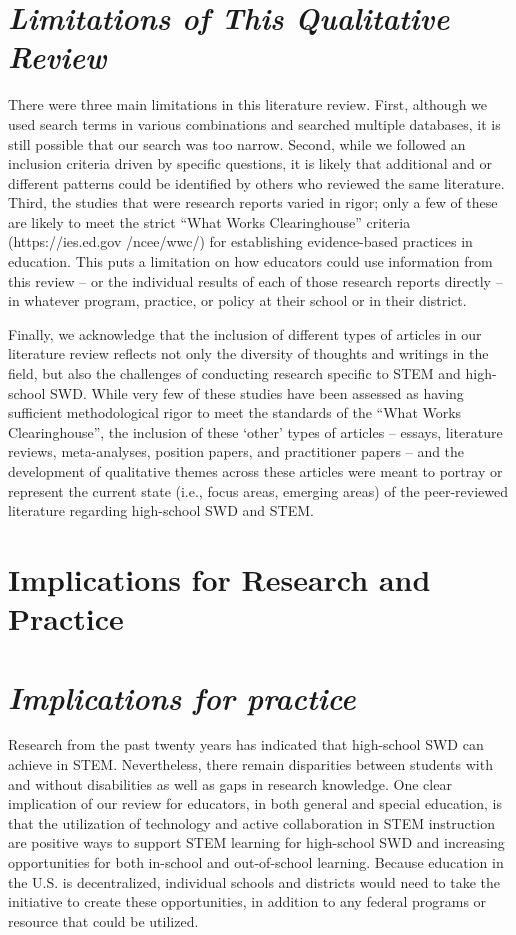 \documentclass[11pt]{sig-alternate}
\begin{document}
\begin{large}
\section*{\textit{Limitations of This Qualitative Review}}
There were three main limitations in this literature review. First, although we used search terms in various combinations and searched multiple databases, it is still possible that our search was too narrow. Second, while we followed an inclusion criteria driven by specific questions, it is likely that additional and or different patterns could be identified by others who reviewed the same literature. Third, the studies that were research reports varied in rigor; only a few of these are likely to meet the strict “What Works Clearinghouse” criteria  (https://ies.ed.gov /ncee/wwc/)  for establishing evidence-based practices in education. This puts a limitation on how educators could use information from this review – or the individual results of each of those research reports directly – in whatever program, practice, or policy at their school or in their district.  

Finally, we acknowledge that the inclusion of different types of articles in our literature review reflects not only the diversity of thoughts and writings in the field, but also the challenges of conducting research specific to STEM and high-school SWD. While very few of these studies have been assessed as having sufficient methodological rigor to meet the standards of the “What Works Clearinghouse”, the inclusion of these ‘other’ types of articles – essays, literature reviews, meta-analyses, position papers, and practitioner papers – and the development of qualitative themes across these articles were meant to portray or represent the current state (i.e., focus areas, emerging areas) of the peer-reviewed literature regarding high-school SWD and STEM.     

\section*{Implications for Research and Practice}
\section*{\textit{Implications for practice    }}
Research from the past twenty years has indicated that high-school SWD can achieve in STEM. Nevertheless, there remain disparities between students with and without disabilities as well as gaps in research knowledge. One clear implication of our review for educators, in both general and special education, is that the utilization of technology and active collaboration in STEM instruction are positive ways to support STEM learning for high-school SWD and increasing opportunities for both in-school and out-of-school learning. Because education in the U.S. is decentralized, individual schools and districts would need to take the initiative to create these opportunities, in addition to any federal programs or resource that could be utilized.  


\end{large}
\end{document}
